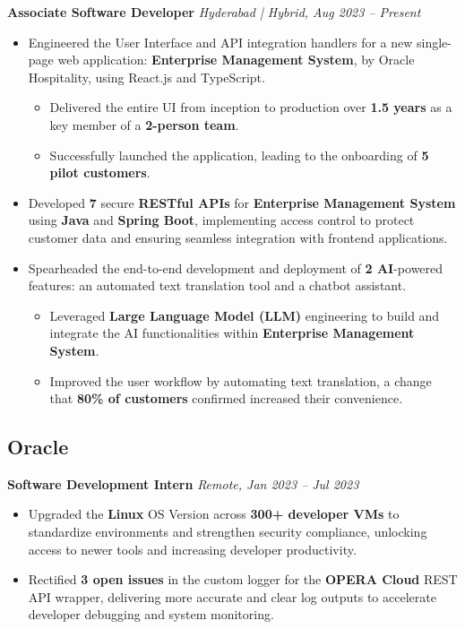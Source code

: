 \documentclass[a4paper,12pt]{article}
\begin{document}
\textbf{Associate Software Developer} \hfill \textit{Hyderabad | Hybrid, Aug 2023 -- Present}
\begin{itemize}[leftmargin=1.5em]
  \item Engineered the User Interface and API integration handlers for a new single-page web application: \textbf{Enterprise Management System}, by Oracle Hospitality, using React.js and TypeScript.
        \begin{itemize} 
            \item Delivered the entire UI from inception to production over \textbf{1.5 years} as a key member of a \textbf{2-person team}.
            \item Successfully launched the application, leading to the onboarding of \textbf{5 pilot customers}.
        \end{itemize}
  \item Developed \textbf{7} secure \textbf{RESTful APIs} for \textbf{Enterprise Management System} using \textbf{Java} and \textbf{Spring Boot}, implementing access control to protect customer data and ensuring seamless integration with frontend applications.
  \item Spearheaded the end-to-end development and deployment of \textbf{2 AI}-powered features: an automated text translation tool and a chatbot assistant.
        \begin{itemize} 
            \item Leveraged \textbf{Large Language Model (LLM)} engineering to build and integrate the AI functionalities within \textbf{Enterprise Management System}.
            \item Improved the user workflow by automating text translation, a change that \textbf{80\% of customers} confirmed increased their convenience.
        \end{itemize}
\end{itemize}

\subsection*{\textbf{Oracle}}
\textbf{Software Development Intern} \hfill \textit{Remote, Jan 2023 -- Jul 2023}
\begin{itemize}[leftmargin=1.5em]
  \item Upgraded the \textbf{Linux} OS Version across \textbf{300+ developer VMs} to standardize environments and strengthen security compliance, unlocking access to newer tools and increasing developer productivity.
  \item Rectified \textbf{3 open issues} in the custom logger for the \textbf{OPERA Cloud} REST API wrapper, delivering more accurate and clear log outputs to accelerate developer debugging and system monitoring.
\end{itemize}
\end{document}
